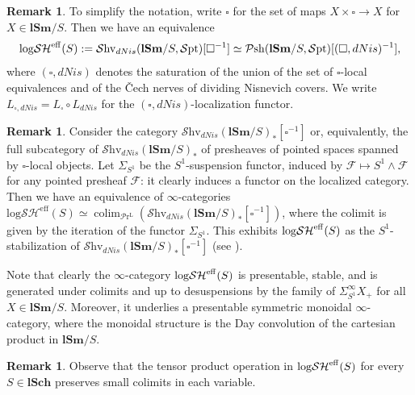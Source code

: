 \documentclass[11pt, a4paper]{amsart}
\theoremstyle{definition}
\newtheorem{rmk}[thm]{Remark}
\numberwithin{equation}{subsection}
\newcommand{\lSch}{\mathbf{lSch}}
\newcommand{\lSm}{\mathbf{lSm}}
\newcommand{\colim}{\operatorname{colim}}		 %
\newcommand{\cF}{\mathcal{F}}
\newcommand{\boxx}{\square}
\newcommand{\eff}{{\rm eff}}
\newcommand{\infPsh}{\mathcal{P}\mathrm{sh}}
\newcommand{\infShv}{\mathcal{S}\mathrm{hv}}
\newcommand{\infSpt}{\mathcal{S}\mathrm{pt}}
\newcommand{\LPr}{\mathcal{P}\mathrm{r}^{\mathrm{L}}}
\newcommand{\inflogSH}{\mathrm{log}\mathcal{SH}}
\newcommand{\inflogSHS}{\mathrm{log}\mathcal{SH}^{\mathrm{eff}}}
\begin{document}
\begin{rmk}
To simplify the notation, write $\boxx$ for the set of maps $X\times \boxx\to X$ for $X\in \lSm/S$.
Then we have an equivalence
\[
\inflogSH^\eff(S)
:=
\infShv_{dNis}(\lSm/S,\infSpt)[\boxx^{-1}]
\simeq
\infPsh(\lSm/S,\infSpt)[(\boxx, dNis)^{-1}],
\]
where $(\boxx, dNis)$ denotes the saturation of the union of the set of $\boxx$-local equivalences and of the \v{C}ech nerves of dividing Nisnevich covers.
We write $L_{\boxx, dNis} = L_{\boxx}\circ L_{dNis}$ for the $(\boxx, dNis)$-localization functor. 
\end{rmk}




\begin{rmk}\label{alter.1.2}
Consider the category $\infShv_{dNis}(\lSm/S)_*[\boxx^{-1}]$ or, equivalently, the full subcategory of $\infShv_{dNis}(\lSm/S)_*$ of presheaves of pointed spaces spanned by $\boxx$-local  objects. Let $\Sigma_{S^1}$
be the $S^1$-suspension functor, induced by $\cF\mapsto S^1\wedge \cF$ for any pointed presheaf $\cF$: it clearly induces a functor on the localized category. Then we have an equivalence of $\infty$-categories $\inflogSHS(S)
\simeq \colim_{\LPr}(\infShv_{dNis}(\lSm/S)_*[\boxx^{-1}])$, where the colimit is given by the iteration of the functor $\Sigma_{S^1}$. This 
 exhibits $\inflogSH^\eff(S)$ as the $S^1$-stabilization  of $\infShv_{dNis}(\lSm/S)_*[\boxx^{-1}]$ (see \cite[Proposition 1.4.2.2]{HA}).
\end{rmk}

Note that clearly the $\infty$-category $\inflogSH^{\eff}(S)$ is presentable, stable, and is generated under colimits and up to desuspensions by the family of $\Sigma^\infty_{S^1}X_+$ for all $X\in \lSm/S$. Moreover, it  underlies a presentable symmetric monoidal $\infty$-category, where the monoidal structure is the Day convolution of the cartesian product in $\lSm/S$.



\begin{rmk}
Observe that the tensor product operation in  $\inflogSH^\eff(S)$ for every $S\in \lSch$ preserves small colimits  in each variable. 
\end{rmk}
\end{document}
